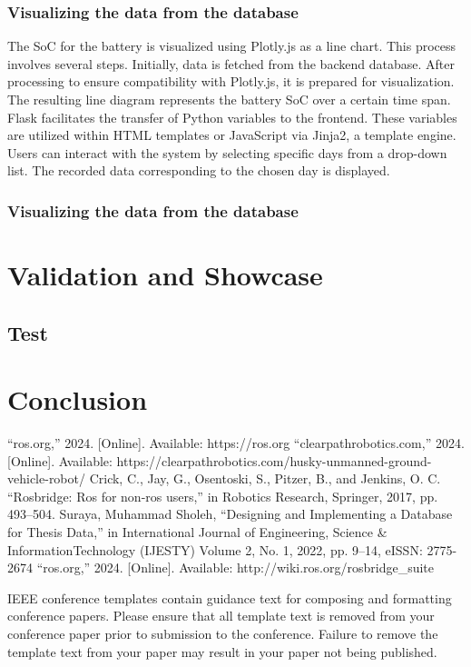 \documentclass[conference]{IEEEtran}
\begin{document}
\subsubsection{Visualizing the data from the database}
The SoC for the battery is visualized using Plotly.js as a line chart. This process involves several steps. Initially, data is fetched from the backend database. After processing to ensure compatibility with Plotly.js, it is prepared for visualization. The resulting line diagram represents the battery SoC over a certain time span. Flask facilitates the transfer of Python variables to the frontend. 
These variables are utilized within HTML templates or JavaScript via Jinja2, a template engine. Users can interact with the system by selecting specific days from a drop-down list. The recorded data corresponding to the chosen day is displayed.
\subsubsection{Visualizing the data from the database}

\section{Validation and Showcase}
\subsection{Test}



\section{Conclusion}

\begin{thebibliography}{00}
 “ros.org,”
2024.
[Online].
Available:
https://ros.org
 “clearpathrobotics.com,”
2024.
[Online].
Available:
https://clearpathrobotics.com/husky-unmanned-ground-vehicle-robot/
 Crick, C., Jay, G., Osentoski, S., Pitzer, B., and Jenkins, O. C. ``Rosbridge: Ros
for non-ros users,'' in Robotics Research, Springer, 2017, pp. 493--504.
 Suraya, Muhammad Sholeh, ``Designing and Implementing a Database for Thesis Data,'' in International Journal of Engineering, Science \& InformationTechnology (IJESTY)
Volume 2, No. 1, 2022, pp. 9--14, eISSN: 2775-2674
“ros.org,” 
2024.
[Online]. 
Available:
http://wiki.ros.org/rosbridge\_suite
\end{thebibliography}
\vspace{12pt}
\color{red}
IEEE conference templates contain guidance text for composing and formatting conference papers. Please ensure that all template text is removed from your conference paper prior to submission to the conference. Failure to remove the template text from your paper may result in your paper not being published.
\end{document}
